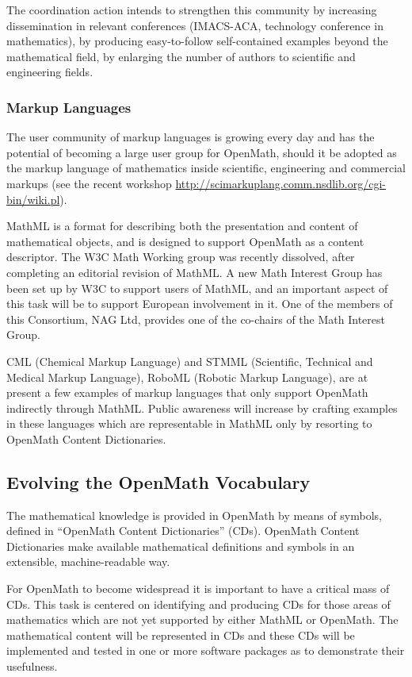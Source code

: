 \documentclass{euproposal}
\begin{document}
The coordination action intends to strengthen this community by
increasing dissemination in relevant conferences (IMACS-ACA,
technology conference in mathematics), by producing easy-to-follow
self-contained examples beyond the mathematical field, by enlarging
the number of authors to scientific and engineering fields.

\subsubsection{Markup Languages}\label{sec:ml}

The user community of markup languages is growing every day and has
the potential of becoming a large user group for OpenMath, should it
be adopted as the markup language of mathematics inside scientific,
engineering and commercial markups (see the recent workshop
\url{http://scimarkuplang.comm.nsdlib.org/cgi-bin/wiki.pl}).

MathML is a format for describing both the presentation and content of
mathematical objects, and is designed to support OpenMath as a content
descriptor.  The W3C Math Working group was recently dissolved, after
completing an editorial revision of MathML.  A new Math Interest Group
has been set up by W3C to support users of MathML, and an important
aspect of this task will be to support European involvement in it.
One of the members of this Consortium, NAG Ltd, provides one of the
co-chairs of the Math Interest Group.

CML (Chemical Markup Language) and STMML (Scientific, Technical and Medical Markup
Language), RoboML (Robotic Markup Language), are at present a few examples of
markup languages that only support OpenMath indirectly through MathML.  Public
awareness will increase by crafting examples in these languages which are
representable in MathML only by resorting to OpenMath Content Dictionaries.

\subsection{Evolving the OpenMath Vocabulary}\label{sec:OCD}

The mathematical knowledge is provided in OpenMath by means of
symbols, defined in ``OpenMath Content Dictionaries'' (CDs).  OpenMath
Content Dictionaries make available mathematical definitions and
symbols in an extensible, machine-readable way.

For OpenMath to become widespread it is important to have a critical
mass of CDs. This task is centered on identifying and producing CDs
for those areas of mathematics which are not yet supported by either
MathML or OpenMath. The mathematical content will be represented in
CDs and these CDs will be implemented and tested in one or more
software packages as to demonstrate their usefulness.
\end{document}
